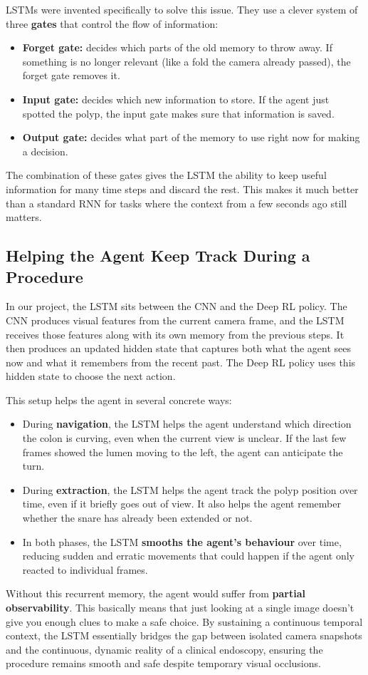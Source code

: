 LSTMs were invented specifically to solve this issue. They use a clever system of three \textbf{gates} that control the flow of information:

\begin{itemize}
\item \textbf{Forget gate:} decides which parts of the old memory to throw away. If something is no longer relevant (like a fold the camera already passed), the forget gate removes it.
\item \textbf{Input gate:} decides which new information to store. If the agent just spotted the polyp, the input gate makes sure that information is saved.
\item \textbf{Output gate:} decides what part of the memory to use right now for making a decision.
\end{itemize}

The combination of these gates gives the LSTM the ability to keep useful information for many time steps and discard the rest. This makes it much better than a standard RNN for tasks where the context from a few seconds ago still matters.

\subsection{Helping the Agent Keep Track During a Procedure}

In our project, the LSTM sits between the CNN and the Deep RL policy. The CNN produces visual features from the current camera frame, and the LSTM receives those features along with its own memory from the previous steps. It then produces an updated hidden state that captures both what the agent sees now and what it remembers from the recent past. The Deep RL policy uses this hidden state to choose the next action.

This setup helps the agent in several concrete ways:

\begin{itemize}
\item During \textbf{navigation}, the LSTM helps the agent understand which direction the colon is curving, even when the current view is unclear. If the last few frames showed the lumen moving to the left, the agent can anticipate the turn.
\item During \textbf{extraction}, the LSTM helps the agent track the polyp position over time, even if it briefly goes out of view. It also helps the agent remember whether the snare has already been extended or not.
\item In both phases, the LSTM \textbf{smooths the agent's behaviour} over time, reducing sudden and erratic movements that could happen if the agent only reacted to individual frames.
\end{itemize}

Without this recurrent memory, the agent would suffer from \textbf{partial observability}. This basically means that just looking at a single image doesn't give you enough clues to make a safe choice. By sustaining a continuous temporal context, the LSTM essentially bridges the gap between isolated camera snapshots and the continuous, dynamic reality of a clinical endoscopy, ensuring the procedure remains smooth and safe despite temporary visual occlusions.
